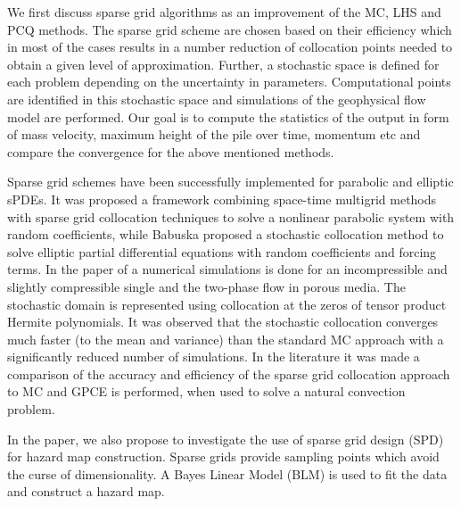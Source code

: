 \documentclass{article}
\begin{document}
We first discuss sparse grid algorithms as an improvement of the MC, LHS and PCQ methods. 
The sparse grid scheme are chosen based on their efficiency which in most of the cases
results in a number reduction of collocation points needed to obtain a given level of approximation. 
Further, a stochastic space is defined for each problem depending on the uncertainty in
parameters. Computational points are identified in this stochastic space and simulations 
of the geophysical flow model are performed. Our goal is to compute the statistics of the 
output in form of mass velocity, maximum height of the pile over time, momentum etc and
compare the convergence for the above mentioned methods. 
 

Sparse grid schemes have been successfully implemented for parabolic and elliptic sPDEs.
It was proposed a framework combining space-time multigrid methods with sparse grid
collocation techniques to solve a nonlinear parabolic system with random coefficients, while
Babuska proposed a stochastic collocation method to solve elliptic partial differential
equations with random coefficients and forcing terms. In the paper of a numerical 
simulations is done for an incompressible and slightly compressible single and the two-phase 
flow in porous media. The stochastic domain is represented using collocation at the zeros of 
tensor product Hermite polynomials. It was observed that the stochastic collocation converges
much faster (to the mean and variance) than the standard MC approach with a significantly 
reduced number of simulations. In the literature it was made a comparison of the accuracy and 
efficiency of the sparse grid collocation approach to MC and GPCE is performed, when used 
to solve a natural convection problem.

In the paper, we also propose to investigate the use of sparse grid design (SPD) for hazard 
map construction. Sparse grids provide sampling points which avoid the curse of dimensionality.
A Bayes Linear Model (BLM) is used to fit the data and construct a hazard map. 
\end{document}
